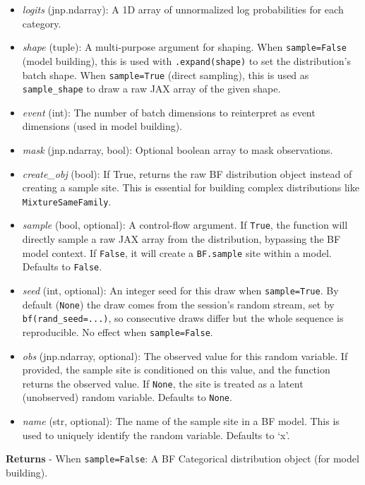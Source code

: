 \documentclass[
  letterpaper,
  DIV=11,
  numbers=noendperiod]{scrartcl}
\begin{document}
\begin{itemize}
\item
  \emph{logits} (jnp.ndarray): A 1D array of unnormalized log
  probabilities for each category.
\item
  \emph{shape} (tuple): A multi-purpose argument for shaping. When
  \texttt{sample=False} (model building), this is used with
  \texttt{.expand(shape)} to set the distribution's batch shape. When
  \texttt{sample=True} (direct sampling), this is used as
  \texttt{sample\_shape} to draw a raw JAX array of the given shape.
\item
  \emph{event} (int): The number of batch dimensions to reinterpret as
  event dimensions (used in model building).
\item
  \emph{mask} (jnp.ndarray, bool): Optional boolean array to mask
  observations.
\item
  \emph{create\_obj} (bool): If True, returns the raw BF distribution
  object instead of creating a sample site. This is essential for
  building complex distributions like \texttt{MixtureSameFamily}.
\item
  \emph{sample} (bool, optional): A control-flow argument. If
  \texttt{True}, the function will directly sample a raw JAX array from
  the distribution, bypassing the BF model context. If \texttt{False},
  it will create a \texttt{BF.sample} site within a model. Defaults to
  \texttt{False}.
\item
  \emph{seed} (int, optional): An integer seed for this draw when
  \texttt{sample=True}. By default (\texttt{None}) the draw comes from
  the session's random stream, set by \texttt{bf(rand\_seed=...)}, so
  consecutive draws differ but the whole sequence is reproducible. No
  effect when \texttt{sample=False}.
\item
  \emph{obs} (jnp.ndarray, optional): The observed value for this random
  variable. If provided, the sample site is conditioned on this value,
  and the function returns the observed value. If \texttt{None}, the
  site is treated as a latent (unobserved) random variable. Defaults to
  \texttt{None}.
\item
  \emph{name} (str, optional): The name of the sample site in a BF
  model. This is used to uniquely identify the random variable. Defaults
  to `x'.
\end{itemize}

\textbf{Returns} - When \texttt{sample=False}: A BF Categorical
distribution object (for model building).
\end{document}
